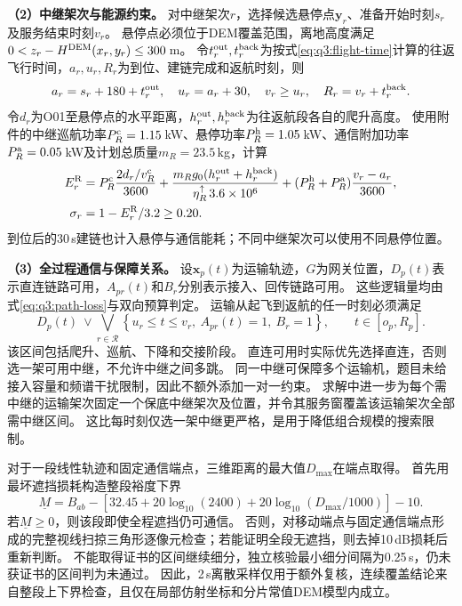 \textbf{（2）中继架次与能源约束。}
对中继架次$r$，选择候选悬停点$\boldsymbol y_r$、准备开始时刻$s_r$及服务结束时刻$v_r$。
悬停点必须位于DEM覆盖范围，离地高度满足$0<z_r-H^{\rm DEM}(x_r,y_r)\le300$\,m。
令$t_r^{\rm out},t_r^{\rm back}$为按式\eqref{eq:q3:flight-time}计算的往返飞行时间，$a_r,u_r,R_r$为到位、建链完成和返航时刻，则
\begin{equation}
  a_r=s_r+180+t_r^{\rm out},\quad
  u_r=a_r+30,\quad v_r\ge u_r,\quad
  R_r=v_r+t_r^{\rm back}.
  \label{eq:q3:relay-time}
\end{equation}
令$d_r$为O01至悬停点的水平距离，$h_r^{\rm out},h_r^{\rm back}$为往返航段各自的爬升高度。
使用附件的中继巡航功率$P_R^{\rm c}=1.15$\,kW、悬停功率$P_R^{\rm h}=1.05$\,kW、通信附加功率$P_R^{\rm a}=0.05$\,kW及计划总质量$m_R=23.5$\,kg，计算
\begin{align}
  E_r^{\rm R}&=P_R^{\rm c}\frac{2d_r/v_R^{\rm c}}{3600}
     +\frac{m_Rg_0(h_r^{\rm out}+h_r^{\rm back})}
       {\eta_R^{\uparrow}\,3.6\times10^6}
     +(P_R^{\rm h}+P_R^{\rm a})\frac{v_r-a_r}{3600},\notag\\
  \sigma_r&=1-E_r^{\rm R}/3.2\ge0.20.
  \label{eq:q3:relay-energy}
\end{align}
到位后的30\,s建链也计入悬停与通信能耗；不同中继架次可以使用不同悬停位置。

\textbf{（3）全过程通信与保障关系。}
设$\boldsymbol x_p(t)$为运输轨迹，$G$为网关位置，$D_p(t)$表示直连链路可用，$A_{pr}(t)$和$B_r$分别表示接入、回传链路可用。
这些逻辑量均由式\eqref{eq:q3:path-loss}与双向预算判定。
运输从起飞到返航的任一时刻必须满足
\begin{equation}
  D_p(t)\ \lor\!
  \bigvee_{r\in\mathcal R}
     \left\{u_r\le t\le v_r,\ A_{pr}(t)=1,\ B_r=1\right\},
  \qquad t\in[o_p,R_p].
  \label{eq:q3:continuous-radio}
\end{equation}
该区间包括爬升、巡航、下降和交接阶段。
直连可用时实际优先选择直连，否则选一架可用中继，不允许中继之间多跳。
同一中继可保障多个运输机，题目未给接入容量和频谱干扰限制，因此不额外添加一对一约束。
求解中进一步为每个需中继的运输架次固定一个保底中继架次及位置，并令其服务窗覆盖该运输架次全部需中继区间。
这比每时刻仅选一架中继更严格，是用于降低组合规模的搜索限制。

对于一段线性轨迹和固定通信端点，三维距离的最大值$D_{\max}$在端点取得。
首先用最坏遮挡损耗构造整段裕度下界
\begin{equation}
  \underline M=B_{ab}-\left[32.45+20\log_{10}(2400)
       +20\log_{10}(D_{\max}/1000)\right]-10.
  \label{eq:q3:certificate}
\end{equation}
若$\underline M\ge0$，则该段即使全程遮挡仍可通信。
否则，对移动端点与固定通信端点形成的完整视线扫掠三角形逐像元检查；若能证明全段无遮挡，则去掉10\,dB损耗后重新判断。
不能取得证书的区间继续细分，独立核验最小细分间隔为0.25\,s，仍未获证书的区间判为未通过。
因此，2\,s离散采样仅用于额外复核，连续覆盖结论来自整段上下界检查，且仅在局部仿射坐标和分片常值DEM模型内成立。

